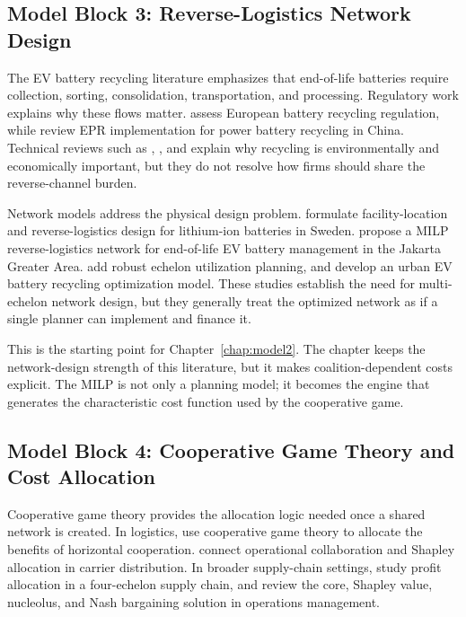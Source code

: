 \subsection{Model Block 3: Reverse-Logistics Network Design}
\label{sec:lit_block3}

The EV battery recycling literature emphasizes that end-of-life batteries require collection, sorting, consolidation, transportation, and processing. Regulatory work explains why these flows matter. \cite{HoarauLorang2022} assess European battery recycling regulation, while \cite{yang2025bridging} review EPR implementation for power battery recycling in China. Technical reviews such as \cite{Harper2019}, \cite{tembo2024lithium}, and \cite{rezaei2025review} explain why recycling is environmentally and economically important, but they do not resolve how firms should share the reverse-channel burden.

Network models address the physical design problem. \cite{tadaros2022location} formulate facility-location and reverse-logistics design for lithium-ion batteries in Sweden. \cite{bafadal2024proposed} propose a MILP reverse-logistics network for end-of-life EV battery management in the Jakarta Greater Area. \cite{wang2025planning} add robust echelon utilization planning, and \cite{ma2024unlocking} develop an urban EV battery recycling optimization model. These studies establish the need for multi-echelon network design, but they generally treat the optimized network as if a single planner can implement and finance it.

This is the starting point for Chapter~\ref{chap:model2}. The chapter keeps the network-design strength of this literature, but it makes coalition-dependent costs explicit. The MILP is not only a planning model; it becomes the engine that generates the characteristic cost function used by the cooperative game.

\subsection{Model Block 4: Cooperative Game Theory and Cost Allocation}
\label{sec:lit_block4}

Cooperative game theory provides the allocation logic needed once a shared network is created. In logistics, \cite{lozano2013cooperative} use cooperative game theory to allocate the benefits of horizontal cooperation. \cite{wang2023collaborative} connect operational collaboration and Shapley allocation in carrier distribution. In broader supply-chain settings, \cite{meng2023profit} study profit allocation in a four-echelon supply chain, and \cite{luo2022core} review the core, Shapley value, nucleolus, and Nash bargaining solution in operations management.

